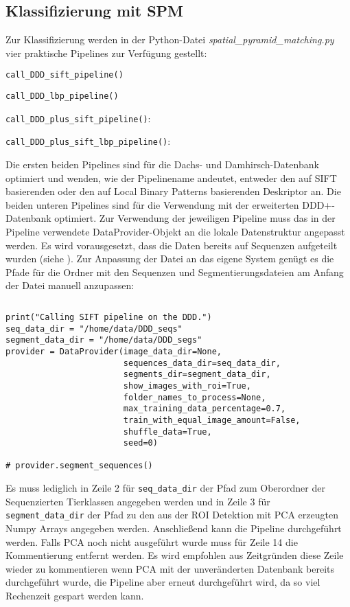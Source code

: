 \subsection*{Klassifizierung mit SPM}
Zur Klassifizierung werden in der Python-Datei \emph{spatial\_pyramid\_matching.py} vier praktische Pipelines zur Verfügung gestellt:
\begin{list}{}{}
\item \texttt{call\_DDD\_sift\_pipeline()}
\item \texttt{call\_DDD\_lbp\_pipeline()}
\item \texttt{call\_DDD\_plus\_sift\_pipeline()}:
\item \texttt{call\_DDD\_plus\_sift\_lbp\_pipeline()}:
\end{list}
Die ersten beiden Pipelines sind für die Dachs- und Damhirsch-Datenbank optimiert und wenden, wie der Pipelinename andeutet, entweder den auf SIFT basierenden oder den auf Local Binary Patterns basierenden Deskriptor an. Die beiden unteren Pipelines sind für die Verwendung mit der erweiterten DDD+-Datenbank optimiert.
Zur Verwendung der jeweiligen Pipeline muss das in der Pipeline verwendete DataProvider-Objekt an die lokale Datenstruktur angepasst werden. Es wird vorausgesetzt, dass die Daten bereits auf Sequenzen aufgeteilt wurden (siehe ). Zur Anpassung der Datei an das eigene System genügt es die Pfade für die Ordner mit den Sequenzen und Segmentierungsdateien am Anfang der Datei manuell anzupassen:

\begin{verbatim}

\end{verbatim}


\begin{verbatim}
print("Calling SIFT pipeline on the DDD.")
seq_data_dir = "/home/data/DDD_seqs"
segment_data_dir = "/home/data/DDD_segs"
provider = DataProvider(image_data_dir=None,
                        sequences_data_dir=seq_data_dir,
                        segments_dir=segment_data_dir,
                        show_images_with_roi=True,
                        folder_names_to_process=None,
                        max_training_data_percentage=0.7,
                        train_with_equal_image_amount=False,
                        shuffle_data=True,
                        seed=0)

# provider.segment_sequences()
\end{verbatim}
Es muss lediglich in Zeile 2 für \texttt{seq\_data\_dir} der Pfad zum Oberordner der Sequenzierten Tierklassen angegeben werden und in Zeile 3 für \texttt{segment\_data\_dir} der Pfad zu den aus der ROI Detektion mit PCA erzeugten Numpy Arrays angegeben werden. Anschließend kann die Pipeline durchgeführt werden. Falls PCA noch nicht ausgeführt wurde muss für Zeile 14 die Kommentierung entfernt werden. Es wird empfohlen aus Zeitgründen diese Zeile wieder zu kommentieren wenn PCA mit der unveränderten Datenbank bereits durchgeführt wurde, die Pipeline aber erneut durchgeführt wird, da so viel Rechenzeit gespart werden kann. 
